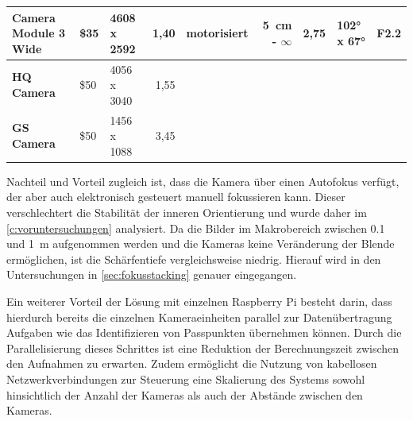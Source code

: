 \documentclass[./00PhotoBox.tex]{subfiles}
\begin{document}
\begin{table}
{\begin{tabular}{l|l|l|r|lr|r|l|r|}
            \multicolumn{1}{|l|}{\textbf{Camera Module 3 Wide}} & \$35                         & \cellcolor[HTML]{9AFF99}4608 x 2592                                  & 1,40                                                              & \multicolumn{1}{l|}{\cellcolor[HTML]{9AFF99}motorisiert}                    & \cellcolor[HTML]{9AFF99}\SI{5}{\centi\metre} - $\infty$                  & 2,75                     & 102° x 67°               & F2.2                         \\ \hline
            \multicolumn{1}{|l|}{\textbf{HQ Camera}}            & \cellcolor[HTML]{FFCCC9}\$50 & 4056 x 3040                                                          & 1,55                                                              & \multicolumn{1}{l|}{\cellcolor[HTML]{FFCCC9}{\color[HTML]{000000} manuell}} & \cellcolor[HTML]{C0C0C0}                                                 & \cellcolor[HTML]{C0C0C0} & \cellcolor[HTML]{C0C0C0} & \cellcolor[HTML]{C0C0C0}     \\ \hline
            \multicolumn{1}{|l|}{\textbf{GS Camera}}            & \cellcolor[HTML]{FFCCC9}\$50 & 1456 x 1088                                                          & \cellcolor[HTML]{9AFF99}3,45                                      & \multicolumn{1}{l|}{\cellcolor[HTML]{FFCCC9}{\color[HTML]{000000} manuell}} & \cellcolor[HTML]{C0C0C0}                                                 & \cellcolor[HTML]{C0C0C0} & \cellcolor[HTML]{C0C0C0} & \cellcolor[HTML]{C0C0C0}     \\ \hline
        \end{tabular}
    }
\end{table}

Nachteil und Vorteil zugleich ist, dass die Kamera über einen Autofokus verfügt, der aber auch elektronisch gesteuert manuell fokussieren kann. Dieser verschlechtert die Stabilität der inneren Orientierung und wurde daher im \autoref{c:voruntersuchungen} analysiert. Da die Bilder im Makrobereich zwischen \SI{0,1}{} und \SI{1}{\metre} aufgenommen werden und die Kameras keine Veränderung der Blende ermöglichen, ist die Schärfentiefe vergleichsweise niedrig. Hierauf wird in den Untersuchungen in \autoref{sec:fokusstacking} genauer eingegangen.

Ein weiterer Vorteil der Lösung mit einzelnen Raspberry Pi besteht darin, dass hierdurch bereits die einzelnen Kameraeinheiten parallel zur Datenübertragung Aufgaben wie das Identifizieren von Passpunkten übernehmen können. Durch die Parallelisierung dieses Schrittes ist eine Reduktion der Berechnungszeit zwischen den Aufnahmen zu erwarten. Zudem ermöglicht die Nutzung von kabellosen Netzwerkverbindungen zur Steuerung eine Skalierung des Systems sowohl hinsichtlich der Anzahl der Kameras als auch der Abstände zwischen den Kameras.
\end{document}
